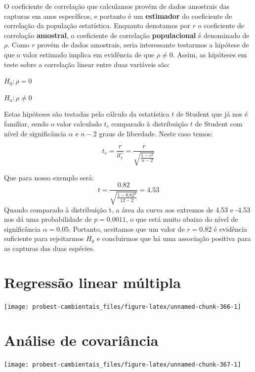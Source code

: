 \documentclass[
]{book}
\begin{document}
O coeficiente de correlação que calculamos provém de dados amostrais das capturas em anos específicos, e portanto é um \textbf{estimador} do coeficiente de correlação da população estatística. Enquanto denotamos por \(r\) o coeficiente de correlação \textbf{amostral}, o coeficiente de correlação \textbf{populacional} é denominado de \(\rho\). Como \(r\) provém de dados amostrais, seria interessante testarmos a hipótese de que o valor estimado implica em evidência de que \(\rho \ne 0\). Assim, as hipóteses em teste sobre a correlação linear entre duas variáveis são:

\(H_0: \rho = 0\)

\(H_a: \rho \ne 0\)

Estas hipóteses são testadas pelo cálculo da estatística \(t\) de Student que já nos é familiar, sendo o valor calculado \(t_c\) comparado à distribuição \(t\) de Student com nível de significância \(\alpha\) e \(n-2\) graus de liberdade. Neste caso temos:

\[t_c = \frac{r}{\hat{\sigma_r}} = \frac{r}{\sqrt{\frac{1-r^2}{n-2}}}\]

Que para nosso exemplo será:
\[t = \frac{0.82}{\sqrt{\frac{1-0.82^2}{12-2}}} = 4.53\]
Quando comparado à distribuição t, a área da curva aos extremos de 4.53 e -4.53 nos dá uma probabilidade de \(p = 0.0011\), o que está muito abaixo do nível de significância \(\alpha = 0.05\). Portanto, aceitamos que um valor de \(r = 0.82\) é evidência suficiente para rejeitarmos \(H_0\) e concluirmos que há uma associação positiva para as capturas das duas espécies.

\hypertarget{regresmultipla}{%
\chapter{Regressão linear múltipla}\label{regresmultipla}}

\begin{center}\texttt{[image: probest-cambientais\_files/figure-latex/unnamed-chunk-366-1]} \end{center}

\hypertarget{ancova}{%
\chapter{Análise de covariância}\label{ancova}}

\begin{center}\texttt{[image: probest-cambientais\_files/figure-latex/unnamed-chunk-367-1]} \end{center}
\end{document}
